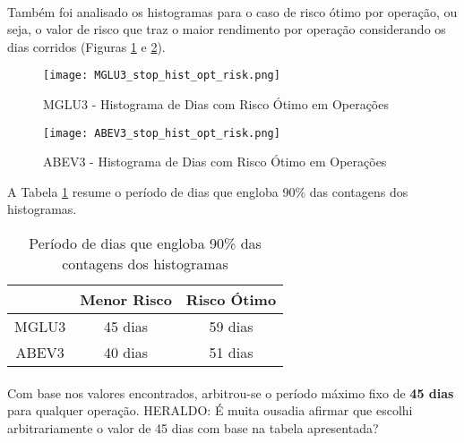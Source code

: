 \paragraph{} Também foi analisado os histogramas para o caso de risco ótimo por operação, ou seja, o valor de risco que traz o maior rendimento por operação considerando os dias corridos (Figuras \ref{fig:122} e \ref{fig:123}).

\begin{figure}[h]
    \texttt{[image: MGLU3\_stop\_hist\_opt\_risk.png]}
    \centering
    \caption{MGLU3 - Histograma de Dias com Risco Ótimo em Operações}
    \label{fig:122}
\end{figure}

\begin{figure}[h]
    \texttt{[image: ABEV3\_stop\_hist\_opt\_risk.png]}
    \centering
    \caption{ABEV3 - Histograma de Dias com Risco Ótimo em Operações}
    \label{fig:123}
\end{figure}

A Tabela \ref{tab:4} resume o período de dias que engloba 90\% das contagens dos histogramas.

\begin{table}[h!]
    \begin{center}
        \begin{tabular}{ c|cc }
            & Menor Risco & Risco Ótimo \\
            \hline
            MGLU3 & 45 dias & 59 dias \\
            ABEV3 & 40 dias & 51 dias \\
        \end{tabular}
        \caption{Período de dias que engloba 90\% das contagens dos histogramas}
        \label{tab:4}
    \end{center}
\end{table}

\paragraph{} Com base nos valores encontrados, arbitrou-se o período máximo fixo de \textbf{45 dias} para qualquer operação. \color{red} HERALDO: É muita ousadia afirmar que escolhi arbitrariamente o valor de 45 dias com base na tabela apresentada? 



